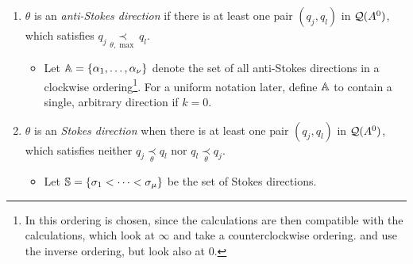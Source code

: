 \begin{defn}
  \begin{enumerate}
    \item $\theta$ is an \emph{anti-Stokes direction} if there is at least one
      pair $(q_j,q_l)$ in $\cQ(A^0)$, which satisfies 
      $q_j \underset{\theta,\max}{\prec} q_l$.
      \begin{itemize}
        \item Let $\A=\{\alpha_1,\dots,\alpha_{\nu}\}$ denote the set of all
          anti-Stokes directions in a clockwise ordering\footnote{In
          \cite{Loday1994} this ordering is chosen, since the calculations are
          then compatible with the calculations, which look at $\infty$ and take
          a counterclockwise ordering. \cite{boalch} and \cite{thboalch} use the
          inverse ordering, but look also at $0$.}. For a uniform notation
          later, define $\A$ to contain a single, arbitrary direction if $k=0$.
      \end{itemize}
    \item $\theta$ is an \emph{Stokes direction} when there is at least one
      pair $(q_j,q_l)$ in $\cQ(A^0)$, which satisfies neither
      $q_j\underset{\theta}{\prec} q_l$ nor $q_l\underset{\theta}{\prec} q_j$.
      \begin{itemize}
        \item Let $\S=\{\sigma_1<\cdots<\sigma_\mu\}$ be the set of Stokes
          directions.
      \end{itemize}
  \end{enumerate}
\end{defn}

\TODO


